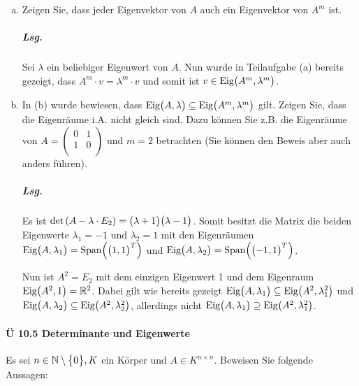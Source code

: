 \documentclass{scrreprt}
\begin{document}
\begin{enumerate}[(a)]
\item Zeigen Sie, dass jeder Eigenvektor von $A$ auch ein Eigenvektor von $A^m$
  ist.

  \subparagraph{Lsg.} Sei $\lambda$ ein beliebiger Eigenwert von $A$.
  Nun wurde in Teilaufgabe (a) bereits gezeigt, dass
  $A^m \cdot v = \lambda^m \cdot v$ und somit ist
  $v \in \text{Eig}\qty\big(A^m, \lambda^m)$.

\newpage
\item In (b) wurde bewiesen, dass
  $\text{Eig}\qty\big(A, \lambda) \subseteq \text{Eig}\qty\big(A^m, \lambda^m)$
  gilt.
  Zeigen Sie, dass die Eigenräume i.A. nicht gleich sind.
  Dazu können Sie z.B. die Eigenräume von $A = \begin{pmatrix}
    0 & 1 \\
    1 & 0 \\
  \end{pmatrix}$ und $m = 2$ betrachten (Sie können den Beweis aber auch anders
  führen).

  \subparagraph{Lsg.} Es ist
  $\det\qty(A - \lambda \cdot E_2) = \qty\big(\lambda + 1)\qty\big(\lambda - 1)$.
  Somit besitzt die Matrix die beiden Eigenwerte $\lambda_1 = -1$ und
  $\lambda_2 = 1$ mit den Eigenräumen
  $\text{Eig}\qty\big(A, \lambda_1) = \text{Span}\qty(\qty\big(1, 1)^T)$ und
  $\text{Eig}\qty\big(A, \lambda_2) = \text{Span}\qty(\qty\big(-1, 1)^T)$.

  Nun ist $A^2 = E_2$ mit dem einzigen Eigenwert 1 und dem Eigenraum
  $\text{Eig}\qty\big(A^2, 1) = \mathbb{R}^2$.
  Dabei gilt wie bereits gezeigt
  $\text{Eig}\qty\big(A, \lambda_1) \subseteq \text{Eig}\qty\big(A^2, \lambda_1^2)$
  und
  $\text{Eig}\qty\big(A, \lambda_2) \subseteq \text{Eig}\qty\big(A^2, \lambda_2^2)$,
  allerdings nicht
  $\text{Eig}\qty\big(A, \lambda_1) \supseteq \text{Eig}\qty\big(A^2, \lambda_1^2)$.
\end{enumerate}

\paragraph{Ü 10.5 Determinante und Eigenwerte}

Es sei $n \in \mathbb{N} \setminus \qty\big{0}, K$ ein Körper und
$A \in K^{n \times n}$.
Beweisen Sie folgende Aussagen:

\end{document}
